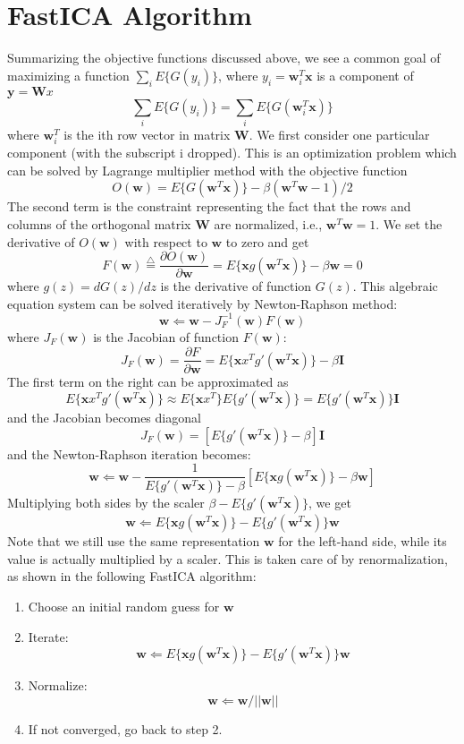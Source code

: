 \documentclass[12pt, a4paper, onecolumn]{IEEEtran}
\begin{document}
\section{FastICA Algorithm}

Summarizing the objective functions discussed above, we see a common goal of
maximizing a function $\sum_i E\{ G(y_i) \}$, where $y_i={\mathbf w}_i^T
{\mathbf x}$ is a component of ${\mathbf y}={\mathbf Wx}$
\[	\sum_i E\{ G(y_i) \}=\sum_i E\{ G( {\mathbf w}_i^T {\mathbf x} ) \}	\]
where ${\mathbf w}_i^T$ is the ith row vector in matrix ${\mathbf W}$. We first
consider one particular component (with the subscript i dropped). This is an
optimization problem which can be solved by Lagrange multiplier method with
the objective function
\[	O({\mathbf w})=E\{ G( {\mathbf w}^T {\mathbf x} ) \}
	-\beta( {\mathbf w}^T{\mathbf w}-1)/2	\]
The second term is the constraint representing the fact that the rows and
columns of the orthogonal matrix ${\mathbf W}$ are normalized, i.e.,
${\mathbf w}^T{\mathbf w}=1$. We set the derivative of $O({\mathbf w})$ with
respect to ${\mathbf w}$ to zero and get
\[	F({\mathbf w})\stackrel{\triangle}{=}
	\frac{\partial O({\mathbf w})}{ \partial {\mathbf w}}
	=E\{ {\mathbf x}g( {\mathbf w}^T {\mathbf x} ) \}-\beta {\mathbf w}=0	\]
where $g(z)=dG(z)/dz$ is the derivative of function $G(z)$. This algebraic
equation system can be solved iteratively by Newton-Raphson method:
\[ {\mathbf w} \Leftarrow {\mathbf w}-J_F^{-1}({\mathbf w}) F({\mathbf w}) \]
where $J_F({\mathbf w})$ is the Jacobian of function $F({\mathbf w})$:
\[
J_F({\mathbf w})=\frac{\partial F}{\partial {\mathbf w}}=
E\{{\mathbf xx}^T g'({\mathbf w}^T{\mathbf x})\}-\beta{\mathbf I}
\]
The first term on the right can be approximated as
\[ E\{{\mathbf xx}^T g'({\mathbf w}^T{\mathbf x})\}
	\approx E\{{\mathbf xx}^T\} E\{g'({\mathbf w}^T{\mathbf x})\}
	=E\{g'({\mathbf w}^T{\mathbf x})\} {\mathbf I}
\]
and the Jacobian becomes diagonal
\[ J_F({\mathbf w})=[E\{g'({\mathbf w}^T{\mathbf x})\}-\beta] {\mathbf I} \]
and the Newton-Raphson iteration becomes:
\[ {\mathbf w} \Leftarrow {\mathbf w}-\frac{1}{E\{g'({\mathbf w}^T{\mathbf x})\}-\beta}[E\{ {\mathbf x}g( {\mathbf w}^T {\mathbf x} ) \}-\beta {\mathbf w}]
	\]
Multiplying both sides by the scaler $\beta-E\{g'({\mathbf w}^T{\mathbf x})\}$,
we get
\[ {\mathbf w} \Leftarrow E\{ {\mathbf x}g( {\mathbf w}^T {\mathbf x} ) \}
-E\{g'({\mathbf w}^T{\mathbf x})\} {\mathbf w}	\]
Note that we still use the same representation ${\mathbf w}$ for the
left-hand side, while its value is actually multiplied by a scaler. This is
taken care of by renormalization, as shown in the following FastICA algorithm:
\begin{enumerate}
\item Choose an initial random guess for ${\mathbf w}$
\item Iterate:
\[ {\mathbf w} \Leftarrow E\{ {\mathbf x}g( {\mathbf w}^T {\mathbf x} ) \}
	-E\{g'({\mathbf w}^T{\mathbf x})\} {\mathbf w}	\]
\item Normalize:
	\[ {\mathbf w} \Leftarrow {\mathbf w}/||{\mathbf w}||	\]
\item If not converged, go back to step 2.
\end{enumerate}
\end{document}

